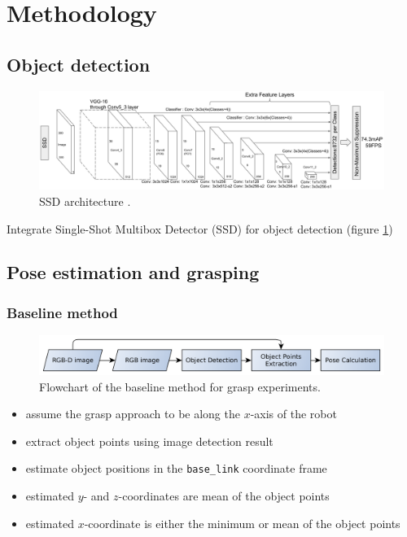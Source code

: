\documentclass[runningheads]{../llncs}
\begin{document}
\section{Methodology}

\subsection{Object detection}

\begin{figure}[h!]
    \centering
    \includegraphics[width=\textwidth]{liu_et_al-2016-ssd_arch}
    \caption{SSD architecture \cite{Liu2016SSD}.}
    \label{fig:ssd_arch}
\end{figure}

Integrate Single-Shot Multibox Detector (SSD) for object detection (figure \ref{fig:ssd_arch})

\subsection{Pose estimation and grasping}
\subsubsection*{Baseline method}
\begin{figure}[h!]
    \centering
    \includegraphics[width=\textwidth]{grasp_plan_pose_estimation}
    \caption{Flowchart of the baseline method for grasp experiments.}
    \label{fig:grasp_plan_baseline}
\end{figure}

\begin{itemize}
    \item assume the grasp approach to be along the $ x $-axis of the robot
    \item extract object points using image detection result
    \item estimate object positions in the \texttt{base\_link} coordinate frame
    \item estimated $ y $- and $ z $-coordinates are mean of the object points
    \item estimated $ x $-coordinate is either the minimum or mean of the object points
\end{itemize}
\end{document}
